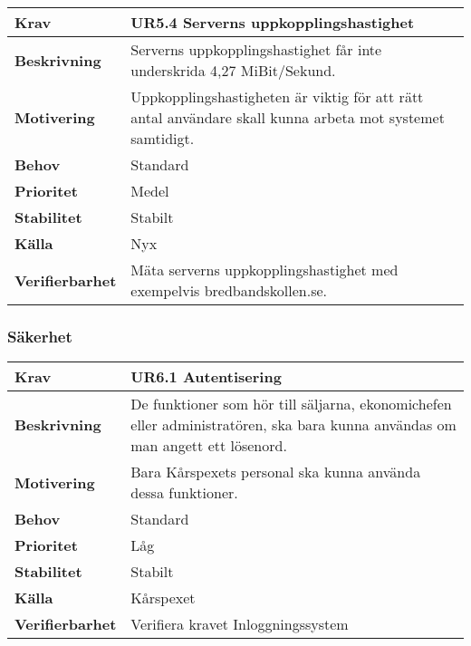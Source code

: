 \documentclass[a4paper, twoside, 11pt, titlepage]{article}
\begin{document}
		\begin{tabular} { p{2.6cm} p{12.5cm} }
			\hline
			\sffamily\textbf{Krav} & \sffamily\textbf{UR5.4 Serverns uppkopplingshastighet } \\
			\hline
			\sffamily\textbf{Beskrivning} & Serverns uppkopplingshastighet får inte underskrida 4,27 MiBit/Sekund.  \\
			\hline
			\sffamily\textbf{Motivering} & Uppkopplingshastigheten är viktig för att rätt antal användare skall kunna arbeta mot systemet samtidigt.  \\
			\hline
			\sffamily\textbf{Behov} & Standard  \\
			\hline
			\sffamily\textbf{Prioritet} & Medel  \\
			\hline
			\sffamily\textbf{Stabilitet} & Stabilt  \\
			\hline
			\sffamily\textbf{Källa} & Nyx  \\
			\hline
			\sffamily\textbf{Verifierbarhet} & Mäta serverns uppkopplingshastighet med exempelvis bredbandskollen.se.  \\
			\hline
		\end{tabular}


		\subsubsection{Säkerhet}


		\begin{tabular} { p{2.6cm} p{12.5cm} }
			\hline
			\sffamily\textbf{Krav} & \sffamily\textbf{UR6.1 Autentisering } \\
			\hline
			\sffamily\textbf{Beskrivning} & De funktioner som hör till säljarna, ekonomichefen eller administratören, ska bara kunna användas om man angett ett lösenord.  \\
			\hline
			\sffamily\textbf{Motivering} & Bara Kårspexets personal ska kunna använda dessa funktioner.  \\
			\hline
			\sffamily\textbf{Behov} & Standard  \\
			\hline
			\sffamily\textbf{Prioritet} & Låg  \\
			\hline
			\sffamily\textbf{Stabilitet} & Stabilt  \\
			\hline
			\sffamily\textbf{Källa} & Kårspexet  \\
			\hline
			\sffamily\textbf{Verifierbarhet} & Verifiera kravet Inloggningssystem  \\
			\hline
		\end{tabular}
		\vspace{6mm}
\end{document}
